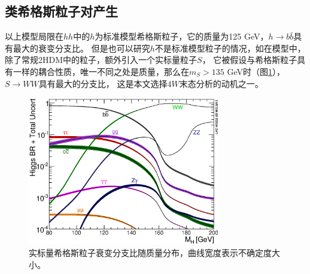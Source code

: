 \subsection{类希格斯粒子对产生}
以上模型局限在$hh$中的$h$为标准模型希格斯粒子，它的质量为125 GeV，$h\rightarrow b\bar{b}$具有最大的衰变分支比。
但是也可以研究$h$不是标准模型粒子的情况，如在模型\cite{ExoticHiggsTheory}中，除了常规2HDM中的粒子，额外引入一个实标量粒子$S$，
它被假设与希格斯粒子具有一样的耦合性质，唯一不同之处是质量，那么在$m_S>135$ GeV时（图\ref{fig:SM-HIGGS-BR}），$S\rightarrow WW$具有最大的分支比，
这是本文选择4$W$末态分析的动机之一。
\begin{figure}
\centering
 \includegraphics[width=0.75\textwidth]{fig/Higgs_BR_LM_RECT.eps}
 \caption{实标量希格斯粒子衰变分支比随质量分布，曲线宽度表示不确定度大小。\cite{SM-HIGGS-BR}}
 \label{fig:SM-HIGGS-BR}
\end{figure}
%
